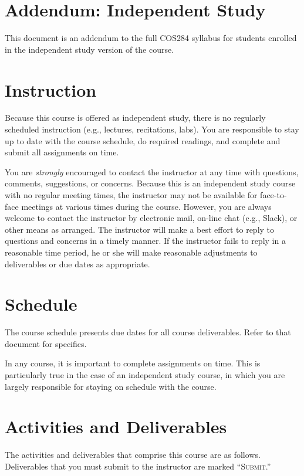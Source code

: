 \documentclass[11pt]{article}
\newcommand{\submit}{\textsc{Submit}}
\begin{document}
\section{Addendum: Independent Study}

This document is an addendum
to the full COS284 syllabus
for students enrolled
in the independent study
version of the course.

\section{Instruction}
\label{sec:instruction}

Because this course is offered as independent study,
there is no regularly scheduled instruction
(e.g., lectures, recitations, labs).
You are responsible to stay up to date with the course schedule,
do required readings,
and complete and submit all assignments on time.

You are \emph{strongly} encouraged to contact the instructor at any time
with questions, comments, suggestions, or concerns.
Because this is an independent study course
with no regular meeting times,
the instructor may not be available for face-to-face meetings
at various times during the course.
However, you are always welcome to contact the instructor
by electronic mail, on-line chat (e.g., Slack),
or other means as arranged.
The instructor will make a best effort to reply to questions and concerns
in a timely manner.
If the instructor fails to reply in a reasonable time period,
he or she will make reasonable adjustments
to deliverables or due dates
as appropriate.

\section{Schedule}
\label{sec:schedule}

The course schedule presents
due dates for all course deliverables.
Refer to that document for specifics.

In any course, it is important to complete assignments on time.
This is particularly true in the case of an independent study course,
in which you are largely responsible for staying on schedule
with the course.

\section{Activities and Deliverables}

The activities and deliverables that comprise this course
are as follows.
Deliverables that you must submit to the instructor
are marked ``\submit.''
\end{document}
